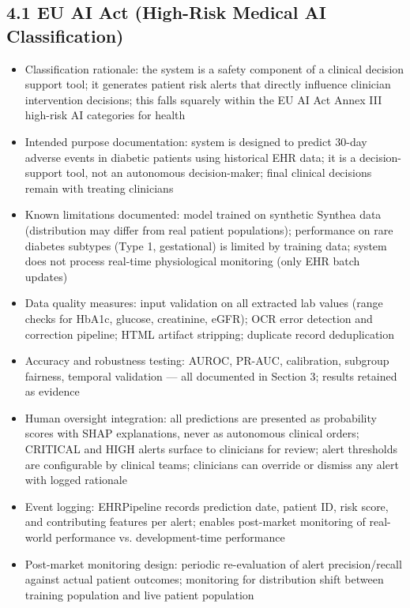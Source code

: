 \documentclass[11pt,a4paper]{article}
\begin{document}
\subsection{4.1 EU AI Act (High-Risk Medical AI Classification)}
\begin{itemize}
\item Classification rationale: the system is a safety component of a clinical decision support tool; it generates patient risk alerts that directly influence clinician intervention decisions; this falls squarely within the EU AI Act Annex III high-risk AI categories for health
\item Intended purpose documentation: system is designed to predict 30-day adverse events in diabetic patients using historical EHR data; it is a decision-support tool, not an autonomous decision-maker; final clinical decisions remain with treating clinicians
\item Known limitations documented: model trained on synthetic Synthea data (distribution may differ from real patient populations); performance on rare diabetes subtypes (Type 1, gestational) is limited by training data; system does not process real-time physiological monitoring (only EHR batch updates)
\item Data quality measures: input validation on all extracted lab values (range checks for HbA1c, glucose, creatinine, eGFR); OCR error detection and correction pipeline; HTML artifact stripping; duplicate record deduplication
\item Accuracy and robustness testing: AUROC, PR-AUC, calibration, subgroup fairness, temporal validation --- all documented in Section 3; results retained as evidence
\item Human oversight integration: all predictions are presented as probability scores with SHAP explanations, never as autonomous clinical orders; CRITICAL and HIGH alerts surface to clinicians for review; alert thresholds are configurable by clinical teams; clinicians can override or dismiss any alert with logged rationale
\item Event logging: EHRPipeline records prediction date, patient ID, risk score, and contributing features per alert; enables post-market monitoring of real-world performance vs. development-time performance
\item Post-market monitoring design: periodic re-evaluation of alert precision/recall against actual patient outcomes; monitoring for distribution shift between training population and live patient population
\end{itemize}
\end{document}
